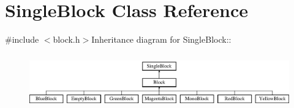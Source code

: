 \hypertarget{class_single_block}{
\section{SingleBlock Class Reference}
\label{class_single_block}
}


{\ttfamily \#include $<$block.h$>$}Inheritance diagram for SingleBlock::\begin{figure}[H]
\begin{center}
\leavevmode
\includegraphics[height=2.4cm]{class_single_block}
\end{center}
\end{figure}
